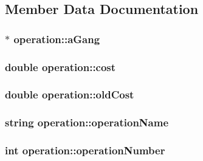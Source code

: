 \subsection{Member Data Documentation}
\hypertarget{classoperation_a5e8e50f58117ebd6c4706c7051dba7a5}{
\subsubsection[{aGang}]{$\ast$ {\bf operation::aGang}}}
\label{classoperation_a5e8e50f58117ebd6c4706c7051dba7a5}
\hypertarget{classoperation_a428131322ca543144396026161f70d51}{
\subsubsection[{cost}]{\setlength{\rightskip}{0pt plus 5cm}double {\bf operation::cost}}}
\label{classoperation_a428131322ca543144396026161f70d51}
\hypertarget{classoperation_abc0d99e0dba88ebc3d46fcb9fba77083}{
\subsubsection[{oldCost}]{\setlength{\rightskip}{0pt plus 5cm}double {\bf operation::oldCost}}}
\label{classoperation_abc0d99e0dba88ebc3d46fcb9fba77083}
\hypertarget{classoperation_ab4ae27405ba51acde05bd0b0a109edde}{
\subsubsection[{operationName}]{\setlength{\rightskip}{0pt plus 5cm}string {\bf operation::operationName}}}
\label{classoperation_ab4ae27405ba51acde05bd0b0a109edde}
\hypertarget{classoperation_a0dfdfa94be6ba40de784c3bf2be860f6}{
\subsubsection[{operationNumber}]{\setlength{\rightskip}{0pt plus 5cm}int {\bf operation::operationNumber}}}
